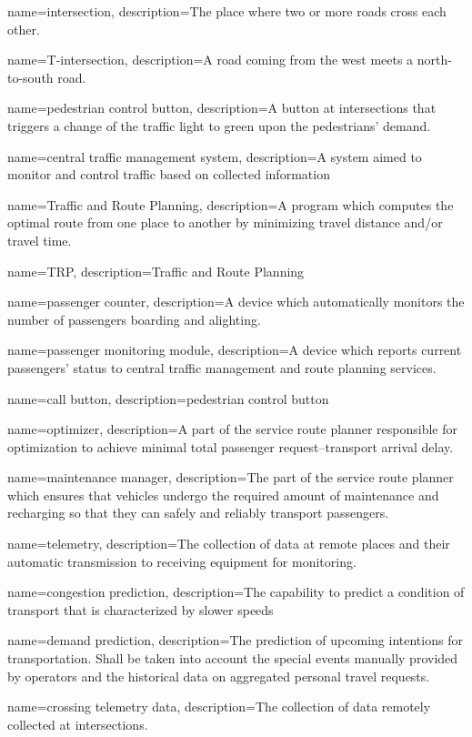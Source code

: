 {%
	name={intersection},
	description={The place where two or more roads cross each other.}
}

{%
	name={T-intersection},
	description={A road coming from the west meets a north-to-south road.}
}

{%
	name={pedestrian control button},
	description={A button at intersections that triggers a change of the traffic light to green upon the pedestrians’ demand.}
}

{%
	name={central traffic management system},
	description={A system aimed to monitor and control traffic based on collected information}
}

{%
	name={Traffic and Route Planning},
	description={A program which computes the optimal route from one place to another by minimizing travel distance and/or travel time.}
}

{%
	name={TRP},
	description={Traffic and Route Planning}
}

{%
	name={passenger counter},
	description={A device which automatically monitors the number of passengers boarding and alighting.}
}

{%
	name={passenger monitoring module},
	description={A device which reports current passengers’ status to central traffic management and route planning services.}
}

{%
	name={call button},
	description={pedestrian control button}
}

{%
	name={optimizer},
	description={A part of the service route planner responsible for optimization to achieve minimal total passenger request–transport arrival delay.}
}

{%
	name={maintenance manager},
	description={The part of the service route planner which ensures that vehicles undergo the required amount of maintenance and recharging so that they can safely and reliably transport passengers.}
}

{%
	name={telemetry},
	description={The collection of data at remote places and their automatic transmission to receiving equipment for monitoring.}
}

{%
	name={congestion prediction},
	description={The capability to predict a condition of transport that is characterized by slower speeds}
}

{%
	name={demand prediction},
	description={The prediction of upcoming intentions for transportation. Shall be taken into account the special events manually provided by operators and the historical data on aggregated personal travel requests.}
}

{%
	name={crossing telemetry data},
	description={The collection of data remotely collected at intersections.}
}

